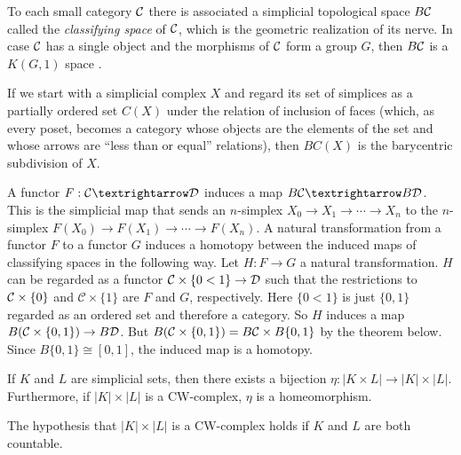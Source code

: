 \documentclass[TFM.tex]{subfiles}
\begin{document}
\begin{ex}\label{exnerve}
To each small category $\mathcal{C}$ there is associated a simplicial topological space $B\mathcal{C}$ called the \emph{classifying
space} of $\mathcal{C}$, which is the geometric realization of its nerve. In
case $\mathcal{C}$ has a single object and the morphisms of $\mathcal{C}$ form a group $G$, then $B\mathcal{C}$ is a $K(G, 1)$ space \cite[Section ]{Hatcher}.

If we start with a
simplicial complex $X$ and regard its set of simplices as a partially ordered set $C(X)$ under
the relation of inclusion of faces (which, as every poset, becomes a category whose objects are the elements of the set and whose arrows are ``less than or equal'' relations), then $BC(X)$ is the barycentric subdivision of $X$.

A functor $F :\CC→\DD$ induces a map $B\CC→B\DD$. This is the simplicial map that sends an
$n$-simplex $X_0→X_1→\cdots →X_n$ to the $n$-simplex $F(X_0)→F(X_1)→\cdots →F(X_n)$.
A natural transformation from a functor $F$ to a functor $G$ induces a homotopy
between the induced maps of classifying spaces in the following way. Let $H:F\to G$ a natural transformation. $H$ can be regarded as a functor $\mathcal{C}\times \{0<1\}\to \mathcal{D}$ such that the restrictions to $\mathcal{C} \times \{0\}$ and $\mathcal{C} \times \{1\}$ are $F$ and $G$, respectively. Here $\{0<1\}$ is just $\{0,1\}$ regarded as an ordered set and therefore a category. So $H$ induces a map $B(\mathcal{C}\times\{0,1\})\to B\mathcal{D}$. But $B(\mathcal{C}\times\{0,1\})=B\mathcal{C}\times B\{0,1\}$ by the theorem below. Since $B\{0,1\}\cong [0,1]$, the induced map is a homotopy. %
\end{ex}

\begin{thm}\cite[Theorem 14.3]{simplicial}
If $K$ and $L$ are simplicial sets, then there exists a bijection $\eta:|K\times L|\to|K|\times|L|$. Furthermore, if $|K|\times|L|$ is a CW-complex, $\eta$ is a homeomorphism.
\end{thm}

\begin{remark}\cite[Theorem A.6]{Hatcher}\label{countable}
The hypothesis that $|K|\times|L|$ is a CW-complex holds if $K$ and $L$ are both countable. 
\end{remark}
\end{document}
